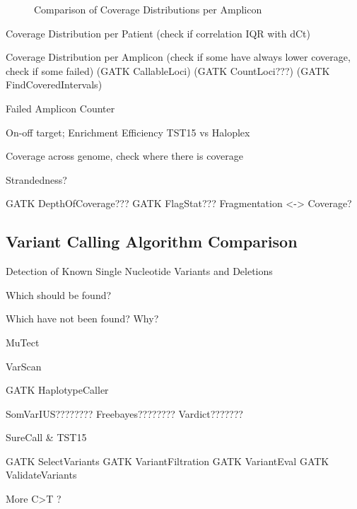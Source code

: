 \begin{figure}[!tbp]
  \centering
  \hfill
  \caption{Comparison of Coverage Distributions per Amplicon}
\end{figure}


Coverage Distribution per Patient (check if correlation IQR with dCt)

Coverage Distribution per Amplicon (check if some have always lower coverage, check if some failed)
(GATK CallableLoci)
(GATK CountLoci???)
(GATK FindCoveredIntervals)

Failed Amplicon Counter

On-off target; Enrichment Efficiency TST15 vs Haloplex

Coverage across genome, check where there is coverage

Strandedness?

GATK DepthOfCoverage???
GATK FlagStat???
Fragmentation <-> Coverage?


\subsection{Variant Calling Algorithm Comparison}
Detection of Known Single Nucleotide Variants and Deletions

Which should be found?

Which have not been found? Why?

MuTect

VarScan

GATK HaplotypeCaller

SomVarIUS????????
Freebayes????????
Vardict???????

SureCall & TST15

GATK SelectVariants
GATK VariantFiltration
GATK VariantEval
GATK ValidateVariants

More C>T ?
